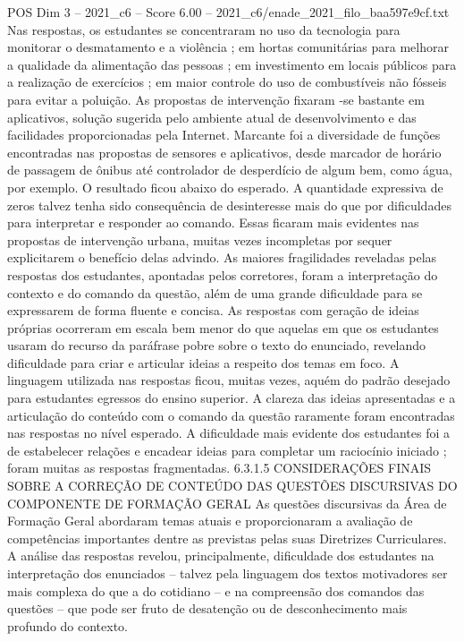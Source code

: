 \begin{textsample}{POS Dim 3 – 2021\_c6 – Score 6.00 – 2021\_c6/enade\_2021\_filo\_baa597e9cf.txt}
Nas respostas, os estudantes se concentraram no uso da tecnologia para monitorar o desmatamento e a violência ; em hortas comunitárias para melhorar a qualidade da alimentação das pessoas ; em investimento em locais públicos para a realização de exercícios ; em maior controle do uso de combustíveis não fósseis para evitar a poluição.
As propostas de intervenção fixaram -se bastante em aplicativos, solução sugerida pelo ambiente atual de desenvolvimento e das facilidades proporcionadas pela Internet.
Marcante foi a diversidade de funções encontradas nas propostas de sensores e aplicativos, desde marcador de horário de passagem de ônibus até controlador de desperdício de algum bem, como água, por exemplo.
O resultado ficou abaixo do esperado.
A quantidade expressiva de zeros talvez tenha sido consequência de desinteresse mais do que por dificuldades para interpretar e responder ao comando.
Essas ficaram mais evidentes nas propostas de intervenção urbana, muitas vezes incompletas por sequer explicitarem o benefício delas advindo.
As maiores fragilidades reveladas pelas respostas dos estudantes, apontadas pelos corretores, foram a interpretação do contexto e do comando da questão, além de uma grande dificuldade para se expressarem de forma fluente e concisa.
As respostas com geração de ideias próprias ocorreram em escala bem menor do que aquelas em que os estudantes usaram do recurso da paráfrase pobre sobre o texto do enunciado, revelando dificuldade para criar e articular ideias a respeito dos temas em foco.
A linguagem utilizada nas respostas ficou, muitas vezes, aquém do padrão desejado para estudantes egressos do ensino superior.
A clareza das ideias apresentadas e a articulação do conteúdo com o comando da questão raramente foram encontradas nas respostas no nível esperado.
A dificuldade mais evidente dos estudantes foi a de estabelecer relações e encadear ideias para completar um raciocínio iniciado ; foram muitas as respostas fragmentadas. 6.3.1.5 CONSIDERAÇÕES FINAIS SOBRE A CORREÇÃO DE CONTEÚDO DAS QUESTÕES DISCURSIVAS DO COMPONENTE DE FORMAÇÃO GERAL As questões discursivas da Área de Formação Geral abordaram temas atuais e proporcionaram a avaliação de competências importantes dentre as previstas pelas suas Diretrizes Curriculares.
A análise das respostas revelou, principalmente, dificuldade dos estudantes na interpretação dos enunciados – talvez pela linguagem dos textos motivadores ser mais complexa do que a do cotidiano – e na compreensão dos comandos das questões – que pode ser fruto de desatenção ou de desconhecimento mais profundo do contexto.

\end{textsample}
